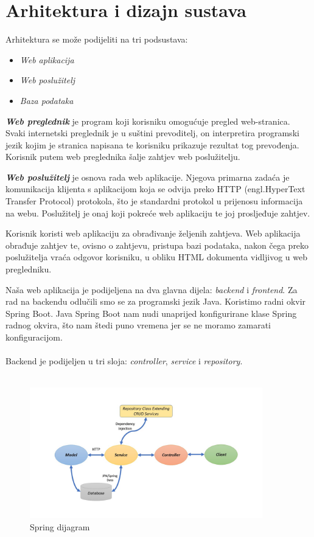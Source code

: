 \chapter{Arhitektura i dizajn sustava}
		
		Arhitektura se može podijeliti na tri podsustava:
		\begin{itemize}
			\item 	\textit{Web aplikacija}
			\item 	\textit{Web poslužitelj}  
			\item 	\textit{Baza podataka}
		\end{itemize}
	
		\textit{\textbf{Web preglednik}} je program koji korisniku omogućuje pregled web-stranica. Svaki internetski  preglednik  je  u suštini prevoditelj, on interpretira programski jezik kojim je stranica napisana te korisniku prikazuje rezultat tog prevođenja. Korisnik  putem  web  preglednika šalje  zahtjev  web poslužitelju.
		
		\textit{\textbf{Web poslužitelj}} je osnova rada web aplikacije. Njegova primarna zadaća je komunikacija klijenta s aplikacijom koja se odvija preko HTTP (engl.HyperText Transfer Protocol) protokola, što je standardni protokol u prijenosu informacija na webu. Poslužitelj je onaj koji pokreće web aplikaciju te joj prosljeđuje zahtjev.
		
		Korisnik koristi web aplikaciju za obrađivanje željenih zahtjeva. Web aplikacija obrađuje zahtjev te, ovisno o zahtjevu, pristupa bazi podataka, nakon čega preko poslužitelja vraća odgovor korisniku, u obliku HTML dokumenta vidljivog u web pregledniku.
		
		Naša web aplikacija je podijeljena na dva glavna dijela: \textit{backend} i \textit{frontend}. Za rad na backendu odlučili smo se za programski jezik Java. Koristimo radni okvir Spring Boot. Java Spring Boot nam nudi unaprijed konfigurirane klase Spring radnog okvira, što nam štedi puno vremena jer se ne moramo zamarati konfiguracijom.\\ \\
		Backend je podijeljen u tri sloja: \textit{controller}, \textit{service} i \textit{repository}. \\ \\
		\begin{figure}[H]
				\centering
				\includegraphics[width=0.9\textwidth]{slike/Spring_dijagram.jpg}
				\caption{Spring dijagram}
				\label{fig:mesh1}
		\end{figure}

